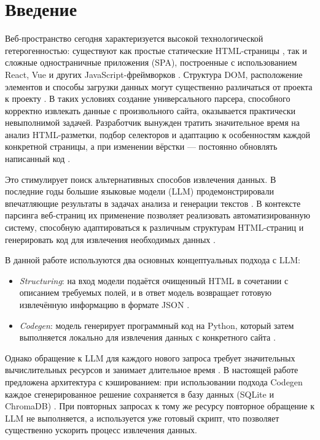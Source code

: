 
\section*{Введение}
\thispagestyle{withCompileDate}

Веб-пространство сегодня характеризуется высокой технологической гетерогенностью:
существуют как простые статические HTML-страницы \cite{RequestsDocumentation}, так и сложные одностраничные приложения (SPA),
построенные с использованием React, Vue и других JavaScript-фреймворков \cite{W3Techs2024}.
Структура DOM, расположение элементов и способы загрузки данных могут существенно различаться от проекта к проекту \cite{Cribbs2019}.
В таких условиях создание универсального парсера, способного корректно извлекать данные с произвольного сайта,
оказывается практически невыполнимой задачей. Разработчик вынужден тратить значительное время
на анализ HTML-разметки, подбор селекторов и адаптацию к особенностям каждой конкретной страницы,
а при изменении вёрстки — постоянно обновлять написанный код \cite{Richardson2013}.

Это стимулирует поиск альтернативных способов извлечения данных.
В последние годы большие языковые модели (LLM) продемонстрировали впечатляющие результаты в задачах анализа и генерации текстов \cite{Brown2020,Kalyan2023}.
В контексте парсинга веб-страниц их применение позволяет реализовать автоматизированную систему, способную адаптироваться к различным структурам HTML-страниц
и генерировать код для извлечения необходимых данных \cite{Kolluru2023HybridParsing}.

В данной работе используются два основных концептуальных подхода с LLM:
\begin{itemize}
	\item \emph{Structuring}: на вход модели подаётся очищенный HTML в сочетании с описанием требуемых полей, и в ответ модель возвращает готовую извлечённую информацию в формате JSON \cite{Brown2020}.
	\item \emph{Codegen}: модель генерирует программный код на Python, который затем выполняется локально для извлечения данных с конкретного сайта \cite{Dong2022CacheLLM}.
\end{itemize}

Однако обращение к LLM для каждого нового запроса требует значительных вычислительных ресурсов и занимает длительное время \cite{OpenAI2023Costs}.
В настоящей работе предложена архитектура с кэшированием: при использовании подхода Codegen каждое сгенерированное решение сохраняется в базу данных (SQLite и ChromaDB) \cite{Reimers2019}.
При повторных запросах к тому же ресурсу повторное обращение к LLM не выполняется, а используется уже готовый скрипт, что позволяет существенно ускорить процесс извлечения данных.
